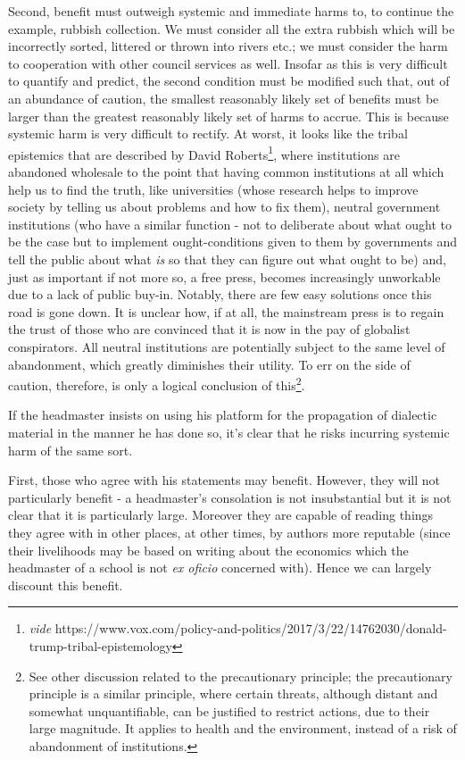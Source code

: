 \documentclass[10pt,a4paper]{article}
\newcounter{count}
\begin{document}
\begin{multicols}{2}
	Second, benefit must outweigh systemic and immediate harms to, to
	continue the example, rubbish collection. We must consider all the extra
	rubbish which will be incorrectly sorted, littered or thrown into rivers
	etc.; we must consider the harm to cooperation with other council
	services as well. Insofar as this is very difficult to quantify and
	predict, the second condition must be modified such that, out of an
	abundance of caution, the smallest reasonably likely set of benefits
	must be larger than the greatest reasonably likely set of harms to
	accrue. This is because systemic harm is very difficult to rectify. At
	worst, it looks like the tribal epistemics that are described by David
	Roberts\footnote{\textit{vide}
		https://www.vox.com/policy-and-politics/2017/3/22/14762030/donald-trump-tribal-epistemology},
	where institutions are abandoned wholesale to the point that having
	common institutions at all which help us to find the truth, like
	universities (whose research helps to improve society by telling us
	about problems and how to fix them), neutral government institutions
	(who have a similar function - not to deliberate about what ought to be
	the case but to implement ought-conditions given to them by governments
	and tell the public about what \textit{is} so that they can figure out
	what ought to be) and, just as important if not more so, a free press,
	becomes increasingly unworkable due to a lack of public buy-in. Notably,
	there are few easy solutions once this road is gone down. It is unclear
	how, if at all, the mainstream press is to regain the trust of those who
	are convinced that it is now in the pay of globalist conspirators. All
	neutral institutions are potentially subject to the same level of
	abandonment, which greatly diminishes their utility. To err on the side
	of caution, therefore, is only a logical conclusion of this\footnote{See
		other discussion related to the precautionary principle; the
		precautionary principle is a similar principle, where certain threats,
		although distant and somewhat unquantifiable, can be justified to
		restrict actions, due to their large magnitude. It applies to health
		and the environment, instead of a risk of abandonment of institutions.}.
	
	If the headmaster insists on using his platform for the propagation of
	dialectic material in the manner he has done so, it's clear that he
	risks incurring systemic harm of the same sort.
	
	First, those who agree with his statements may benefit. However, they
	will not particularly benefit - a headmaster's consolation is not
	insubstantial but it is not clear that it is particularly large.
	Moreover they are capable of reading things they agree with in other
	places, at other times, by authors more reputable (since their
	livelihoods may be based on writing about the economics which the
	headmaster of a school is not \textit{ex oficio} concerned with). Hence we
	can largely discount this benefit.
	

\end{multicols}
\end{document}

